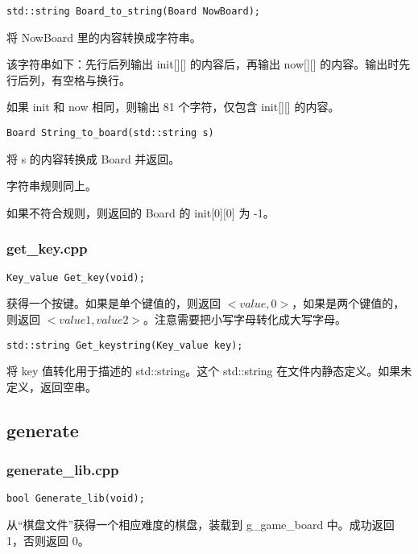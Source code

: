 \documentclass{article}
\begin{document}
    \begin{lstlisting}
std::string Board_to_string(Board NowBoard);
    \end{lstlisting}

    将 NowBoard 里的内容转换成字符串。

    该字符串如下：先行后列输出 init[][] 的内容后，再输出 now[][] 的内容。输出时先行后列，有空格与换行。

    如果 init 和 now 相同，则输出 81 个字符，仅包含 init[][] 的内容。

    \begin{lstlisting}
Board String_to_board(std::string s)
    \end{lstlisting}

    将 s 的内容转换成 Board 并返回。

    字符串规则同上。

    如果不符合规则，则返回的 Board 的 init[0][0] 为 -1。

    \subsubsection{get\_key.cpp}

    \begin{lstlisting}
Key_value Get_key(void);
    \end{lstlisting}

    获得一个按键。如果是单个键值的，则返回 $<value, 0>$，如果是两个键值的，则返回 $<value1, value2>$。注意需要把小写字母转化成大写字母。

    \begin{lstlisting}
std::string Get_keystring(Key_value key);
    \end{lstlisting}

    将 key 值转化用于描述的 std::string。这个 std::string 在文件内静态定义。如果未定义，返回空串。

    \subsection{generate}

    \subsubsection{generate\_lib.cpp}

    \begin{lstlisting}
bool Generate_lib(void);
    \end{lstlisting}

    从“棋盘文件”获得一个相应难度的棋盘，装载到 g\_game\_board 中。成功返回 1，否则返回 0。
\end{document}
